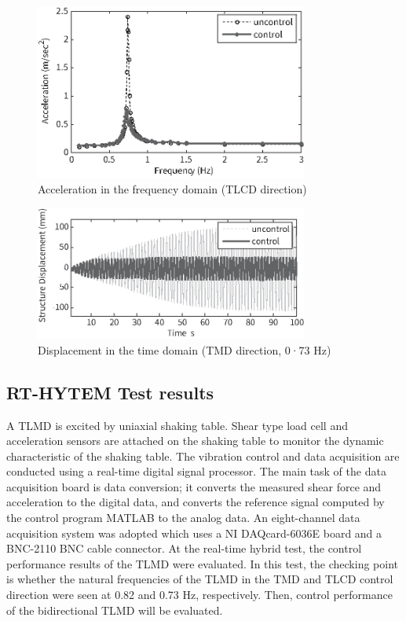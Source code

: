 \begin{figure}[ht]
\centering
\includegraphics[width=0.8\textwidth] {figure/5-10.eps}
\caption{Acceleration in the frequency domain (TLCD direction)}
\label{fig:5-10}
\end{figure}

\begin{figure}[ht]
\centering
\includegraphics[width=0.8\textwidth] {figure/5-11.eps}
\caption{Displacement in the time domain (TMD direction, 0·73 Hz)}
\label{fig:5-11}
\end{figure}

\subsection{RT-HYTEM Test results}
A TLMD is excited by uniaxial shaking table. Shear type load cell and acceleration sensors are attached on the shaking table to monitor the dynamic characteristic of the shaking table. The vibration control and data acquisition are conducted using a real-time digital signal processor. The main task of the data acquisition board is data conversion; it converts the measured shear force and acceleration to the digital data, and converts the reference signal computed by the control program MATLAB to the analog data. An eight-channel data acquisition system was adopted which uses a NI DAQcard-6036E board and a BNC-2110 BNC cable connector. At the real-time hybrid test, the control performance results of the TLMD were evaluated. In this test, the checking point is whether the natural frequencies of the TLMD in the TMD and TLCD control direction were seen at 0.82 and 0.73 Hz, respectively. Then, control performance of the bidirectional TLMD will be evaluated.

